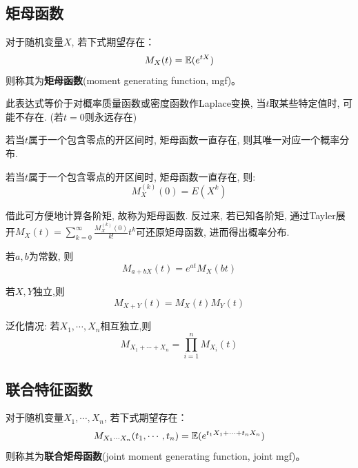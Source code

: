 \subsection{矩母函数}

\begin{definition}
    对于随机变量$X$, 若下式期望存在：
    \[ M_X(t) = \mathbb{E}(e^{tX}) \]
    则称其为\textbf{矩母函数}(moment generating function, mgf)。
\end{definition}

\begin{remark}
    此表达式等价于对概率质量函数或密度函数作Laplace变换, 当$t$取某些特定值时, 可能不存在. (若$t=0$则永远存在)
\end{remark}

\begin{theorem}
    若当$t$属于一个包含零点的开区间时, 矩母函数一直存在, 则其唯一对应一个概率分布.
\end{theorem}

\begin{theorem}
    若当$t$属于一个包含零点的开区间时, 矩母函数一直存在, 则:
    \[ M_X^{(k)}(0) = E(X^k) \]
\end{theorem}

\begin{remark}
    借此可方便地计算各阶矩, 故称为矩母函数. 反过来, 若已知各阶矩, 通过Tayler展开$M_X(t)=\sum_{k=0}^{\infty}\frac{M_X^{(k)}(0)}{k!}t^k$可还原矩母函数, 进而得出概率分布.
\end{remark}

\begin{proposition}
    若$a,b$为常数, 则
    \[ M_{a+b X}(t) = e^{a t}M_X(b t) \]
\end{proposition}

\begin{theorem}\label{thm:mgf_sum}
    若$X,Y$独立,则
    \[ M_{X+Y}(t) = M_X(t) M_Y(t) \]

    泛化情况: 若$X_1,\cdots, X_n$相互独立,则
    \[ M_{X_1+\cdots+ X_n} = \prod_{i=1}^n M_{X_i}(t)\]
\end{theorem}

\subsection{联合特征函数}

\begin{definition}
    对于随机变量$X_1,\cdots, X_n$, 若下式期望存在：
    \[ M_{X_1\cdots X_n}(t_1,\cdots ,t_n) = \mathbb{E}(e^{t_1 X_1+\cdots + t_n X_n}) \]
    则称其为\textbf{联合矩母函数}(joint moment generating function, joint mgf)。
\end{definition}


